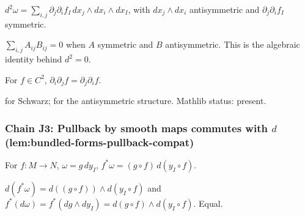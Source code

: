 \begin{lemma}
\label{lem:bfd-r2}
$d^{2}\omega = \sum_{i,j}\partial_{j}\partial_{i}f_{I}\,dx_{j}\wedge dx_{i}\wedge dx_{I}$, with $dx_{j}\wedge dx_{i}$ antisymmetric and $\partial_{j}\partial_{i}f_{I}$ symmetric.
\leanok
\end{lemma}

\begin{lemma}
\label{lem:bfd-r3}
$\sum_{i,j}A_{ij}B_{ij} = 0$ when $A$ symmetric and $B$ antisymmetric.  This is the algebraic identity behind $d^{2} = 0$.
\leanok\mathlibok
\end{lemma}

\begin{lemma}
\label{lem:bfd-r4}
For $f \in C^{2}$, $\partial_{i}\partial_{j}f = \partial_{j}\partial_{i}f$.
\leanok\mathlibok
\end{lemma}

\begin{lemma}
\label{lem:bfd-r5}
 for Schwarz;  for the antisymmetric structure.  Mathlib status: present.
\leanok\mathlibok
\end{lemma}

\subsubsection*{Chain J3: Pullback by smooth maps commutes with $d$ (lem:bundled-forms-pullback-compat)}

\begin{lemma}
\label{lem:bfp-r1}
For $f: M\to N$, $\omega = g\,dy_{I}$, $f^{*}\omega = (g\circ f)\,d(y_{I}\circ f)$.
\leanok
\end{lemma}

\begin{lemma}
\label{lem:bfp-r2}
$d(f^{*}\omega) = d((g\circ f))\wedge d(y_{I}\circ f)$ and $f^{*}(d\omega) = f^{*}(dg\wedge dy_{I}) = d(g\circ f)\wedge d(y_{I}\circ f)$.  Equal.
\leanok
\end{lemma}

